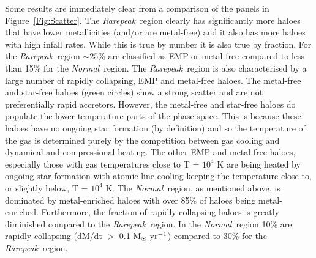 \documentclass[twocolumn,iop,revtex4]{openjournal}
\newcommand{\msolaryrc} {$\rm{M_{\odot}~yr^{-1}}$}
\newcommand{\rarepeak} {\textit{Rarepeak~}}
\newcommand{\normal} {\textit{Normal~}}
\begin{document}
Some results are immediately clear from a comparison of the panels in Figure~\ref{Fig:Scatter}.
The \rarepeak region clearly has significantly more haloes that have lower
metallicities (and/or are metal-free) and it also has more haloes
with high infall rates. While this is true by number it is also true by fraction.
For the \rarepeak region $\sim 25$\% are classified as EMP or metal-free compared to
less than 15\% for the \normal region. The \rarepeak region is also characterised by a
large number of rapidly collapsing, EMP and metal-free haloes. 
The metal-free and star-free haloes (green circles) show a strong scatter and are not preferentially
rapid accretors. However, the metal-free and star-free haloes do populate the lower-temperature parts of the
phase space. This is because these haloes have no ongoing star formation (by definition) and so
the temperature of the gas is determined purely by the competition between gas cooling and
dynamical and compressional heating. The other EMP and metal-free haloes, especially those with gas temperatures
close to T = $10^4$ K are being heated by ongoing star formation with atomic line
cooling keeping the temperature close to, or slightly below, T = $10^4$ K. 
The \normal region, as mentioned above, is dominated by metal-enriched haloes with over 85\% of haloes being metal-enriched.
Furthermore, the fraction of rapidly collapsing haloes is greatly diminished compared to the \rarepeak region. In the
\normal region 10\% are rapidly collapsing (dM/dt $>$ 0.1 \msolaryrc) compared to 30\% for the \rarepeak region.
\end{document}
